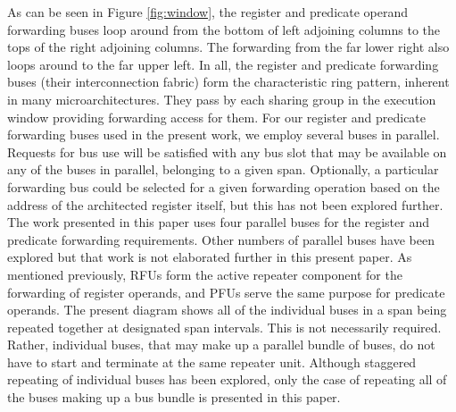\documentclass[10pt,dvips]{article}
\begin{document}
As can be seen 
in Figure \ref{fig:window},
the register and predicate operand forwarding buses
loop around from the bottom of left adjoining columns to the tops of
the right adjoining columns.  The forwarding from the far lower right
also loops around to the far upper left.  In all, the register and
predicate forwarding
buses (their interconnection fabric) form the characteristic ring pattern,
inherent in many microarchitectures.
They pass by each sharing group in the execution window providing
forwarding access for them.
For our register and predicate forwarding buses
used in the present work, we employ several buses in parallel.
Requests for bus use will be satisfied with any bus slot that may be
available on any of the buses in parallel, belonging to
a given span.
Optionally, a particular forwarding bus could be selected
for a given forwarding operation based on the address of the
architected register itself, but this has not been explored further.
The work presented in this paper uses four parallel buses
for the register and predicate forwarding requirements.
Other numbers of parallel buses have been explored but that
work is not elaborated further in this present paper.
As mentioned previously, RFUs form the active repeater
component for the forwarding of register operands,
and PFUs serve the same purpose for predicate operands.
The present diagram shows all of the individual buses in 
a span being repeated together at designated span intervals.
This is not necessarily required.  Rather, individual buses, that may
make up a parallel bundle of buses, do not have to start and
terminate at the same repeater unit.
Although staggered repeating of individual buses has been
explored, only the case of repeating all of the buses
making up a bus bundle is presented in this paper.
\end{document}
